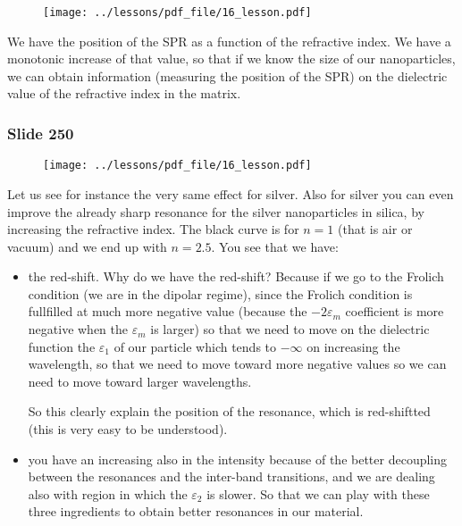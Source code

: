 \documentclass[../main/main.tex]{subfiles}
\begin{document}
\begin{figure}[h!]
\centering
\texttt{[image: ../lessons/pdf\_file/16\_lesson.pdf]}
\end{figure}

We have the position of the SPR as a function of the refractive index. We have a monotonic increase of that value, so that if we know the size of our nanoparticles, we can obtain information (measuring the position of the SPR) on the dielectric value of the refractive index in the matrix.

\newpage

\subsubsection{Slide 250}

\begin{figure}[h!]
\centering
\texttt{[image: ../lessons/pdf\_file/16\_lesson.pdf]}
\end{figure}

Let us see for instance the very same effect for silver. Also for silver you can even improve the already sharp resonance for the silver nanoparticles in silica, by increasing the refractive index. The black curve is for \( n=1 \) (that is air or vacuum) and we end up with \( n=2.5 \). You see that we have:
\begin{itemize}
\item the red-shift. Why do we have the red-shift? Because if we go to the Frolich condition (we are in the dipolar regime), since the Frolich condition is fullfilled at much more negative value (because the \( -2 \varepsilon _m \) coefficient is more negative when the \( \varepsilon _m \) is larger) so that we need to move on the dielectric function the \( \varepsilon _1 \) of our particle which tends to \( - \infty  \) on increasing the wavelength, so that we need to move toward more negative values so we can need to move toward larger wavelengths.

So this clearly explain the position of the resonance, which is red-shiftted (this is very easy to be understood).

\item you have an increasing also in the intensity because of the better decoupling between the resonances and the inter-band transitions, and we are dealing also with region in which the \( \varepsilon _2 \) is slower. So that we can play with these three ingredients to obtain better resonances in our material.

\end{itemize}
\end{document}

